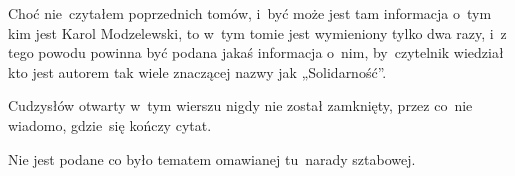\documentclass[a4paper,11pt]{article}
\begin{document}
\vspace{\spaceFour}



\start {} Choć nie~czytałem poprzednich tomów, i~być może jest
tam informacja o~tym kim jest Karol Modzelewski, to w~tym tomie jest
wymieniony tylko dwa razy, i~z tego powodu powinna być podana jakaś
informacja o~nim, by~czytelnik wiedział kto jest autorem tak wiele
znaczącej nazwy jak „Solidarność”.

\vspace{\spaceFour}



\start {} Cudzysłów otwarty w~tym wierszu nigdy nie został
zamknięty, przez co~nie wiadomo, gdzie~się kończy cytat.

\vspace{\spaceFour}



\start {} Nie jest podane co było tematem omawianej
tu~narady sztabowej.



\vspace{\spaceTwo}













\end{document}
